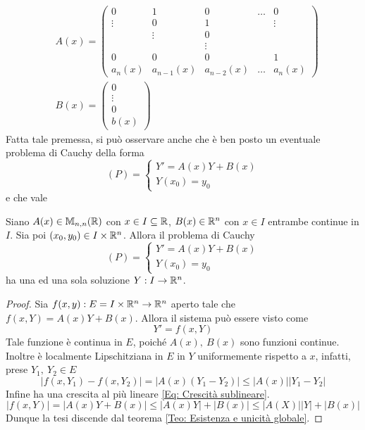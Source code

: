 \begin{align}
&A(x)=\begin{pmatrix}
    0 & 1 & 0 & \dots &  0\\
    \vdots & 0 & 1 & \,  &\vdots\\
    \, & \vdots & 0 & \,  &\,\\
    \, & \, & \vdots & \,  &\,\\
    0 & 0 & 0 & \,  & 1\\
    a_n(x) & a_{n-1}(x) & a_{n-2}(x) & \dots & a_n(x)
\end{pmatrix}\\
&B(x)= \begin{pmatrix}
    0\\
    \vdots\\
    0\\
    b(x)
\end{pmatrix}
\end{align}
Fatta tale premessa, si può osservare anche che è ben posto un eventuale problema di Cauchy della forma
\begin{equation}
    (P)=\begin{cases}
        Y'=A(x)Y+B(x)\\
        Y(x_0)=y_0
    \end{cases}
\end{equation}
e che vale
\begin{theorem}
    Siano $A(x) \in \mathbb{M}_{n,n}(\mathbb{R})$ con $x \in I \subseteq \mathbb{R}$, $B(x) \in \mathbb{R}^n$ con $x \in I$ entrambe continue in $I$. Sia poi $(x_0, y_0) \in I \times \mathbb{R}^n$. Allora il problema di Cauchy
    \begin{equation}
    (P)=\begin{cases}
        Y'=A(x)Y+B(x)\\
        Y(x_0)=y_0
    \end{cases}
    \end{equation}
    ha una ed una sola soluzione $Y: I \to \mathbb{R}^n$.
\end{theorem}
\begin{proof}
    Sia $f(x,y): E=I \times \mathbb{R}^n \to \mathbb{R}^n$ aperto tale che $f(x,Y)=A(x)Y+B(x)$. Allora il sistema può essere visto come 
    \begin{equation}
        Y'=f(x, Y)
    \end{equation}
    Tale funzione è continua in $E$, poiché $A(x),\ B(x)$ sono funzioni continue.
    Inoltre è localmente Lipschitziana in $E$ in $Y$ uniformemente rispetto a $x$, infatti, prese $Y_1,\ Y_2 \in E$
    \begin{equation}
    |f(x, Y_1)- f(x, Y_2)|=|A(x)(Y_1-Y_2)|\leq |A(x)||Y_1-Y_2|
    \end{equation}
    Infine ha una crescita al più lineare \eqref{Eq: Crescità sublineare}. 
    \begin{equation}
        |f(x, Y)|=|A(x)Y+B(x)| \leq |A(x)Y|+|B(x)| \leq |A(X)||Y|+|B(x)|
    \end{equation}
    Dunque la tesi discende dal teorema \ref{Teo: Esistenza e unicità globale}.
\end{proof}
